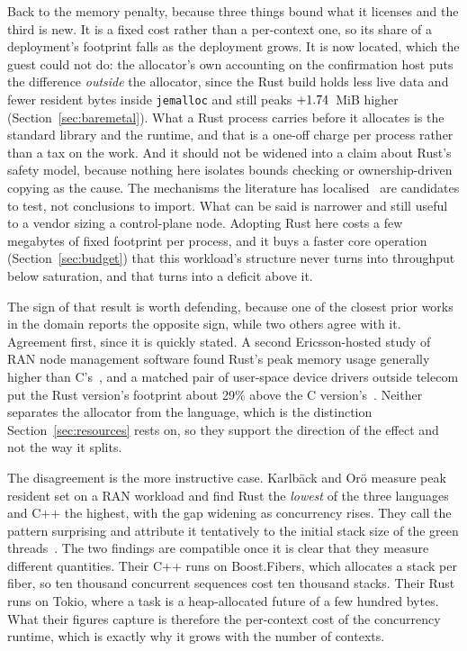 \documentclass[english,oneside,a4paper,censored,csm,software-track-2020]{HYthesisML}
\begin{document}
Back to the memory penalty, because three things bound what it licenses and the third is new. It is
a fixed cost rather than a per-context one, so
its share of a deployment's footprint falls as the deployment grows. It is now located, which the
guest could not do: the allocator's own accounting on the confirmation host puts the difference
\emph{outside} the allocator, since the Rust build holds less live data and fewer resident bytes
inside \texttt{jemalloc} and still peaks $+1.74$~MiB higher
(Section~\ref{sec:baremetal}). What a Rust process carries before it allocates is the standard
library and the runtime, and that is a one-off charge per process rather than a tax on the work.
And it should not be widened into a claim about Rust's safety
model, because nothing here isolates bounds checking or ownership-driven copying as the cause.
The mechanisms the literature has localised~\cite{zhang2022runtime,harris2023morello}
are candidates to test, not conclusions to import. What can be said is narrower and still
useful to a vendor sizing a control-plane node. Adopting Rust here costs a few megabytes of
fixed footprint per process, and it buys a faster core operation
(Section~\ref{sec:budget}) that this workload's structure never turns into throughput below
saturation, and that turns into a deficit above it.

The sign of that result is worth defending, because one of the closest prior works in the domain
reports the opposite sign, while two others agree with it. Agreement first, since it is quickly
stated. A second Ericsson-hosted study of RAN node management software found Rust's peak memory
usage generally higher than C's~\cite{olsson2023ranmgmt}, and a matched pair of user-space device
drivers outside telecom put the Rust version's footprint about 29\% above the C
version's~\cite{sundvisson2026drivers}. Neither separates the allocator from the language, which
is the distinction Section~\ref{sec:resources} rests on, so they support the direction of the
effect and not the way it splits.

The disagreement is the more instructive case. Karlb\"ack and Or\"o measure peak resident set on a RAN workload and
find Rust the \emph{lowest} of the three languages and C++ the highest, with the gap widening
as concurrency rises. They call the pattern surprising and attribute it tentatively to the initial
stack size of the green threads~\cite{karlback2021ran}. The two
findings are compatible once it is clear that they measure different quantities. Their C++ runs
on Boost.Fibers, which allocates a stack per fiber, so ten thousand concurrent sequences cost
ten thousand stacks. Their Rust runs on Tokio, where a task is a heap-allocated future of a few
hundred bytes. What their figures capture is therefore the per-context cost of the concurrency
runtime, which is exactly why it grows with the number of contexts.
\end{document}
